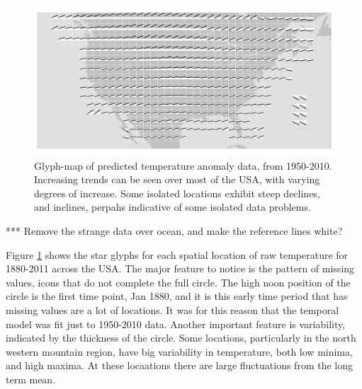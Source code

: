 \documentclass[oneside]{article}
\begin{document}
\begin{figure}[htbp]
  \centering
  \includegraphics[width=1\linewidth]{gistemp-pred}%


  \caption{Glyph-map of predicted temperature anomaly data, from
    1950-2010. Increasing trends can be seen over most of the USA,
    with varying degrees of increase. Some isolated locations exhibit
    steep declines, and inclines, perpahs indicative of some isolated
    data problems.}
  \label{fig:gistemp-pred}
\end{figure}

*** Remove the strange data over ocean, and make the reference lines white?


Figure \ref{fig:gistemp-pred} shows the star glyphs for each spatial location of raw temperature for 1880-2011 across the USA. The major feature to notice is the pattern of missing values, icons that do not complete the full circle. The high noon position of the circle is the first time point, Jan 1880, and it is this early time period that has missing values are a lot of locations. It was for this reason that the temporal model was fit just to 1950-2010 data. Another important feature is variability, indicated by the thickness of the circle. Some locations, particularly in the north western mountain region, have big variability in temperature, both low minima, and high maxima. At these locaations there are large fluctuations from the long term mean.
\end{document}
